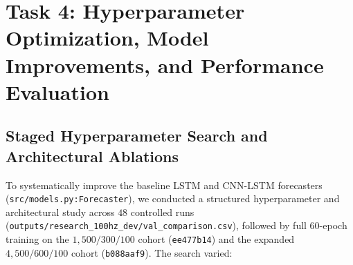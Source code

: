 \documentclass[11pt,a4paper]{article}
\begin{document}
\section{Task 4: Hyperparameter Optimization, Model Improvements, and Performance Evaluation}
\label{sec:hyperparameter_optimization}

\subsection{Staged Hyperparameter Search and Architectural Ablations}
To systematically improve the baseline LSTM and CNN-LSTM forecasters (\texttt{src/models.py:Forecaster}), we conducted a structured hyperparameter and architectural study across $48$ controlled runs (\texttt{outputs/research\_100hz\_dev/val\_comparison.csv}), followed by full 60-epoch training on the $1{,}500 / 300 / 100$ cohort (\texttt{ee477b14}) and the expanded $4{,}500 / 600 / 100$ cohort (\texttt{b088aaf9}). The search varied:
\end{document}

